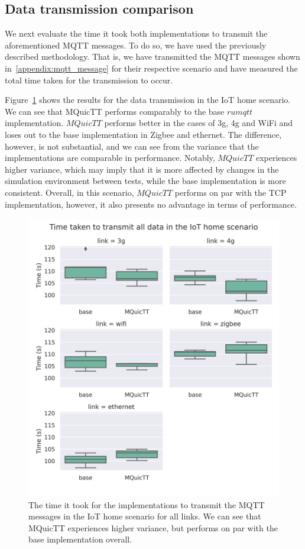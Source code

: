 \subsection{Data transmission comparison}

We next evaluate the time it took both implementations to transmit the aforementioned MQTT messages.
To do so, we have used the previously described methodology.
That is, we have transmitted the MQTT messages shown in~\ref{appendix:mqtt_message} for their respective scenario and have measured the total time taken for the transmission to occur.

Figure~\ref{fig:comm_time_home} shows the results for the data transmission in the IoT home scenario.
We can see that MQuicTT performs comparably to the base $rumqtt$ implementation.
$MQuicTT$ performs better in the cases of 3g, 4g and WiFi and loses out to the base implementation in Zigbee and ethernet.
The difference, however, is not substantial, and we can see from the variance that the implementations are comparable in performance.
Notably, $MQuicTT$ experiences higher variance, which may imply that it is more affected by changes in the simulation environment between tests, while the base implementation is more consistent.
Overall, in this scenario, $MQuicTT$ performs on par with the TCP implementation, however, it also presents no advantage in terms of performance.

\begin{figure}
    \centering
    \includegraphics[width=1\linewidth]{images/analysis_comm_time_home.png}
    \caption{The time it took for the implementations to transmit the MQTT messages in the IoT home scenario for all links.
        We can see that MQuicTT experiences higher variance, but performs on par with the base implementation overall.}
    \label{fig:comm_time_home}
\end{figure}


